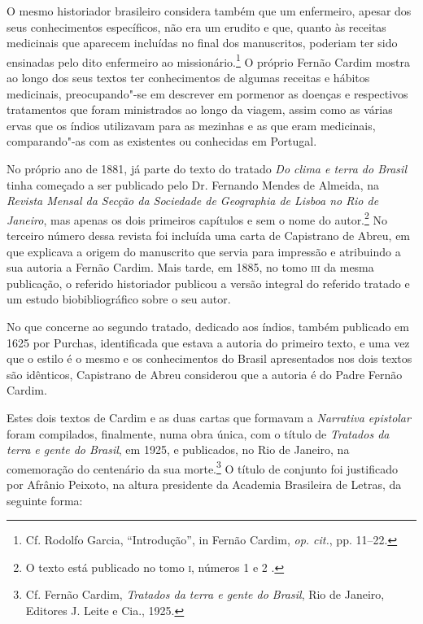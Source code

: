 O mesmo historiador brasileiro considera também que um enfermeiro,
apesar dos seus conhecimentos específicos, não era um erudito e que,
quanto às receitas medicinais que aparecem incluídas no final dos
manuscritos, poderiam ter sido ensinadas pelo dito enfermeiro ao
missionário.\footnote{ Cf. Rodolfo Garcia, ``Introdução'', in
Fernão Cardim, \textit{op. cit.}, pp. 11--22.} O próprio Fernão Cardim
mostra ao longo dos seus textos ter conhecimentos de algumas receitas e
hábitos medicinais, preocupando"-se em descrever em pormenor as doenças
e respectivos tratamentos que foram ministrados ao longo da viagem,
assim como as várias ervas que os índios utilizavam para as mezinhas e
as que eram medicinais, comparando"-as com as existentes ou conhecidas em Portugal. 

No próprio ano de 1881, já parte do texto do tratado \textit{Do clima
e terra do Brasil} tinha começado a ser publicado pelo Dr. Fernando
Mendes de Almeida, na \textit{Revista Mensal da Secção da Sociedade de
Geographia de Lisboa no Rio de Janeiro}, mas apenas os dois primeiros
capítulos e sem o nome do autor.\footnote{ O texto está publicado no
tomo \textsc{i}, números 1 e 2 .} No terceiro número dessa revista foi
incluída uma carta de Capistrano de Abreu, em que explicava a origem do
manuscrito que servia para impressão e atribuindo a sua autoria a
Fernão Cardim. Mais tarde, em 1885, no tomo \textsc{iii} da mesma
publicação, o referido historiador publicou a versão integral
do referido tratado e um estudo biobibliográfico sobre o seu autor. 

No que concerne ao segundo tratado, dedicado aos índios,
também publicado em 1625 por Purchas, identificada que estava a
autoria do primeiro texto, e uma vez que o estilo é o mesmo e os
conhecimentos do Brasil apresentados nos dois textos são idênticos,
Capistrano de Abreu considerou que a autoria é do Padre Fernão Cardim.

Estes dois textos de Cardim e as duas cartas que formavam a
\textit{Narrativa epistolar} foram compilados, finalmente, numa obra
única, com o título de \textit{Tratados da terra e gente do Brasil}, em
1925, e publicados, no Rio de Janeiro, na comemoração do centenário da
sua morte.\footnote{ Cf. Fernão Cardim, \textit{Tratados da terra
e gente do Brasil}, Rio de Janeiro, Editores J. Leite e Cia., 1925.} O
título de conjunto foi justificado por Afrânio Peixoto, na altura
presidente da Academia Brasileira de Letras, da seguinte forma:

